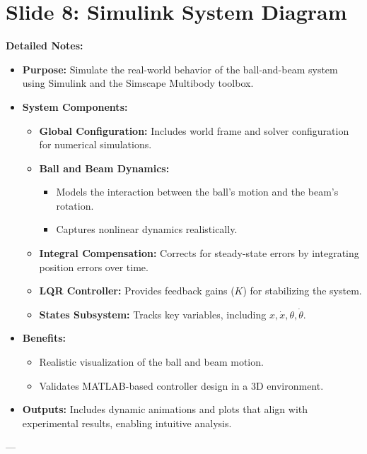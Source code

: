 \documentclass[12pt]{article}
\begin{document}
\section*{Slide 8: Simulink System Diagram}
\textbf{Detailed Notes:}
\begin{itemize}
    \item \textbf{Purpose:} Simulate the real-world behavior of the ball-and-beam system using Simulink and the Simscape Multibody toolbox.
    \item \textbf{System Components:}
    \begin{itemize}
        \item \textbf{Global Configuration:} Includes world frame and solver configuration for numerical simulations.
        \item \textbf{Ball and Beam Dynamics:}
        \begin{itemize}
            \item Models the interaction between the ball’s motion and the beam’s rotation.
            \item Captures nonlinear dynamics realistically.
        \end{itemize}
        \item \textbf{Integral Compensation:} Corrects for steady-state errors by integrating position errors over time.
        \item \textbf{LQR Controller:} Provides feedback gains (\(K\)) for stabilizing the system.
        \item \textbf{States Subsystem:} Tracks key variables, including \(x, \dot{x}, \theta, \dot{\theta}\).
    \end{itemize}
    \item \textbf{Benefits:}
    \begin{itemize}
        \item Realistic visualization of the ball and beam motion.
        \item Validates MATLAB-based controller design in a 3D environment.
    \end{itemize}
    \item \textbf{Outputs:} Includes dynamic animations and plots that align with experimental results, enabling intuitive analysis.
\end{itemize}

---
\newpage
\end{document}
